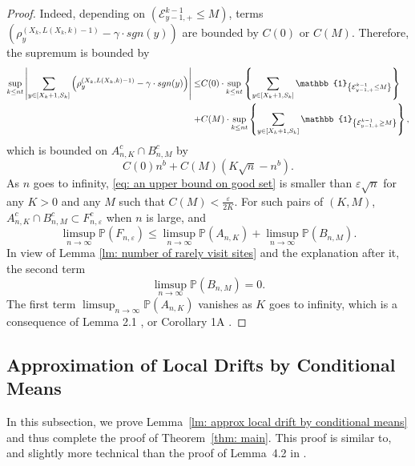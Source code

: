 \documentclass[twoside,12pt, a4paper]{article}
\numberwithin{equation}{section}
\theoremstyle{remark}
\newcommand{\abs}[1]{\left\vert #1 \right\vert}
\begin{document}
\begin{proof}
		Indeed, depending on $(\mathcal{E}^{k-1}_{y-1,+} \leq M)$, terms  $\left( \rho^{(X_k,L(X_k,k)-1)}_y -  \gamma \cdot sgn(y) \right)$ are bounded by $C(0)$ or $C(M)$. Therefore, the supremum is bounded by
		\begin{align*}
			\sup_{k\leq n t}  \abs{  	\sum_{y\in [X_{k}+1 ,S_k]} \left( \rho^{(X_k,L(X_k,k)-1)}_y -  \gamma \cdot sgn(y) \right) } \leq &  
			C(0) \cdot \sup_{k\leq n t} \left\{   	\sum_{y\in [X_{k}+1 ,S_k]} \mathbb{1}_{ \left\{ \mathcal{E}^{k-1}_{y-1,+} \leq M \right\} } \right\}
			\notag
			\\
			+& C(M) \cdot \sup_{k\leq n t} \left\{   	\sum_{y\in [X_{k}+1 ,S_k]} \mathbb{1}_{ \left\{ \mathcal{E}^{k-1}_{y-1,+} \geq M \right\} } \right\},
		\end{align*} which is bounded on $A^c_{n,K} \cap B^c_{n,M}$ by
		\begin{equation}\label{eq: an upper bound on good set}
			C(0)n^b  + C(M) \left(K \sqrt{n} -n^b\right).
		\end{equation} As $n$ goes to infinity, \eqref{eq: an upper bound on good set} is smaller than $\varepsilon \sqrt{n}$ for any $K>0$ and any $M$ such that $C(M) < \frac{\varepsilon}{2K}$. 
		For such pairs of $(K,M)$, $A^c_{n,K} \cap B^c_{n,M} \subset F^c_{n,\varepsilon}$ when $n$ is large,  and 
		$$
		\limsup_{n\to \infty} \mathbb{P}(F_{n,\varepsilon}) \leq \limsup_{n\to \infty}  \mathbb{P}(A_{n,K}) +  \limsup_{n\to \infty}  \mathbb{P}(B_{n,M}).
		$$ In view of Lemma \ref{lm: number of rarely visit sites} and the explanation after it, the second term $$\limsup_{n\to \infty}  \mathbb{P}(B_{n,M})=0.$$  The first term $\limsup_{n\to \infty}  \mathbb{P}(A_{n,K}) $ vanishes as $K$ goes to infinity, which is a consequence of Lemma 2.1 \cite{KMP23}, or Corollary 1A \cite{T96}.
	\end{proof}
	
	
	\subsection{Approximation of Local Drifts by Conditional Means}
	\label{sec:DeltaRho}
	In this subsection, we prove Lemma~\ref{lm: approx local drift by conditional means} and thus complete the proof of Theorem~\ref{thm: main}. This proof is similar to, and slightly more technical than the proof of {Lemma~4.2} in \cite{KP16}. 
	
\end{document}
